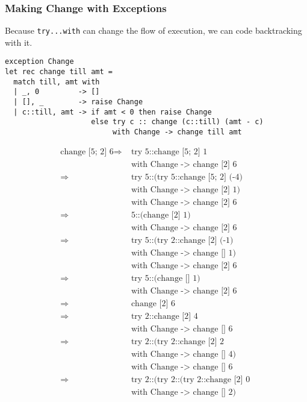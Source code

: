 \documentclass[12pt,a4paper]{article} %
\begin{document}
\subsubsection{Making Change with Exceptions}
Because \verb|try...with| can change the flow of execution, we can code backtracking with it.
\begin{lstlisting}[language=caml]
exception Change
let rec change till amt =
  match till, amt with
  | _, 0         -> []
  | [], _        -> raise Change
  | c::till, amt -> if amt < 0 then raise Change
                    else try c :: change (c::till) (amt - c)
                         with Change -> change till amt
\end{lstlisting}
$$
\begin{aligned}
\text{change [5; 2] 6}
  \Rightarrow &\; \text{try 5::change [5; 2] 1}\\
              &\; \text{with Change -> change [2] 6}\\
  \Rightarrow &\; \text{try 5::(try 5::change [5; 2] (-4)}\\
              &\; \text{with Change -> change [2] 1)}\\
              &\; \text{with Change -> change [2] 6}\\
  \Rightarrow &\; \text{5::(change [2] 1)}\\
              &\; \text{with Change -> change [2] 6}\\
  \Rightarrow &\; \text{try 5::(try 2::change [2] (-1)}\\
              &\; \text{with Change -> change [] 1)}\\
              &\; \text{with Change -> change [2] 6} \\
  \Rightarrow &\; \text{try 5::(change [] 1)}\\
              &\; \text{with Change -> change [2] 6} \\
  \Rightarrow &\; \text{change [2] 6} \\
  \Rightarrow &\; \text{try 2::change [2] 4}\\
              &\; \text{with Change -> change [] 6} \\
  \Rightarrow &\; \text{try 2::(try 2::change [2] 2}\\
              &\; \text{with Change -> change [] 4)}\\
              &\; \text{with Change -> change [] 6} \\
  \Rightarrow &\; \text{try 2::(try 2::(try 2::change [2] 0 }\\
              &\; \text{with Change -> change [] 2)}\\

\end{aligned}$$
\end{document}
